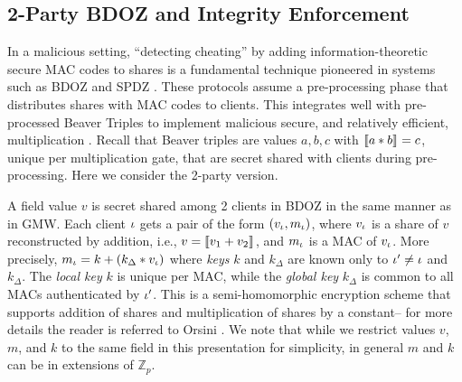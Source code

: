 \subsection{2-Party BDOZ and Integrity Enforcement}
\label{section-example-bdoz}



In a malicious setting, ``detecting cheating'' by adding
information-theoretic secure MAC codes to shares is a fundamental
technique pioneered in systems such as BDOZ and SPDZ
\cite{SPDZ1,SPDZ2,BDOZ,10.1007/978-3-030-68869-1_3}.  These protocols
assume a pre-processing phase that distributes shares with MAC codes
to clients.  This integrates well with pre-processed Beaver Triples to
implement malicious secure, and relatively efficient, multiplication
\cite{evans2018pragmatic}. Recall that Beaver triples are values $a,b,c$ with
$\llbracket a * b \rrbracket_{} = c$, unique per multiplication gate, that are secret
shared with clients during pre-processing. Here we consider the
2-party version.

A field value $v$ is secret shared among 2 clients in BDOZ in the same
manner as in GMW.  Each client $\iota$ gets a pair of the form
$(v_\iota,m_\iota)$, where $v_\iota$ is a share of $v$ reconstructed by
addition, i.e., $v = \llbracket v_1 + v_2 \rrbracket_{}$, and $m_\iota$ is a MAC of
$v_\iota$.  More precisely, $m_\iota = k + (k_\Delta * v_\iota)$ where
\emph{keys} $k$ and $k_\Delta$ are known only to $\iota' \ne \iota$ and
$k_\Delta$. The \emph{local key} $k$ is unique per MAC, while the
\emph{global key} $k_\Delta$ is common to all MACs authenticated by
$\iota'$. This is a semi-homomorphic encryption scheme that supports
addition of shares and multiplication of shares by a constant-- for
more details the reader is referred to Orsini
\cite{10.1007/978-3-030-68869-1_3}. We note that while we restrict
values $v$, $m$, and $k$ to the same field in this presentation for
simplicity, in general $m$ and $k$ can be in extensions of
$\mathbb{Z}_p$.


